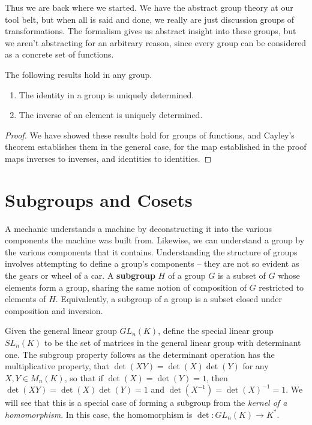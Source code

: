 Thus we are back where we started. We have the abstract group theory at our tool belt, but when all is said and done, we really are just discussion groups of transformations. The formalism gives us abstract insight into these groups, but we aren't abstracting for an arbitrary reason, since every group can be considered as a concrete set of functions.

\begin{corollary}
    The following results hold in any group.
    \begin{enumerate}
        \item The identity in a group is uniquely determined.
        \item The inverse of an element is uniquely determined.
    \end{enumerate}
\end{corollary}
\begin{proof}
    We have showed these results hold for groups of functions, and Cayley's theorem establishes them in the general case, for the map established in the proof maps inverses to inverses, and identities to identities.
\end{proof}

\section{Subgroups and Cosets}

A mechanic understands a machine by deconstructing it into the various components the machine was built from. Likewise, we can understand a group by the various components that it contains. Understanding the structure of groups involves attempting to define a group's components -- they are not so evident as the gears or wheel of a car. A {\bf subgroup} $H$ of a group $G$ is a subset of $G$ whose elements form a group, sharing the same notion of composition of $G$ restricted to elements of $H$. Equivalently, a subgroup of a group is a subset closed under composition and inversion.

\begin{example}
    Given the general linear group $GL_n(K)$, define the special linear group $SL_n(K)$ to be the set of matrices in the general linear group with determinant one. The subgroup property follows as the determinant operation has the multiplicative property, that $\det(XY) = \det(X)\det(Y)$ for any $X,Y \in M_n(K)$, so that if $\det(X) = \det(Y) = 1$, then $\det(XY) = \det(X)\det(Y) = 1$ and $\det(X^{-1}) = \det(X)^{-1} = 1$. We will see that this is a special case of forming a subgroup from the {\it kernel of a homomorphism}. In this case, the homomorphism is $\det: GL_n(K) \to K^*$.
\end{example}

